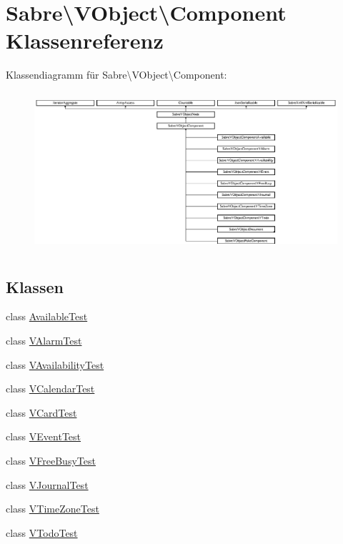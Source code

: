 \hypertarget{class_sabre_1_1_v_object_1_1_component}{}\section{Sabre\textbackslash{}V\+Object\textbackslash{}Component Klassenreferenz}
\label{class_sabre_1_1_v_object_1_1_component}
Klassendiagramm für Sabre\textbackslash{}V\+Object\textbackslash{}Component\+:\begin{figure}[H]
\begin{center}
\leavevmode
\includegraphics[height=5.918699cm]{class_sabre_1_1_v_object_1_1_component}
\end{center}
\end{figure}
\subsection*{Klassen}
\begin{DoxyCompactItemize}
\item 
class \mbox{\hyperlink{class_sabre_1_1_v_object_1_1_component_1_1_available_test}{Available\+Test}}
\item 
class \mbox{\hyperlink{class_sabre_1_1_v_object_1_1_component_1_1_v_alarm_test}{V\+Alarm\+Test}}
\item 
class \mbox{\hyperlink{class_sabre_1_1_v_object_1_1_component_1_1_v_availability_test}{V\+Availability\+Test}}
\item 
class \mbox{\hyperlink{class_sabre_1_1_v_object_1_1_component_1_1_v_calendar_test}{V\+Calendar\+Test}}
\item 
class \mbox{\hyperlink{class_sabre_1_1_v_object_1_1_component_1_1_v_card_test}{V\+Card\+Test}}
\item 
class \mbox{\hyperlink{class_sabre_1_1_v_object_1_1_component_1_1_v_event_test}{V\+Event\+Test}}
\item 
class \mbox{\hyperlink{class_sabre_1_1_v_object_1_1_component_1_1_v_free_busy_test}{V\+Free\+Busy\+Test}}
\item 
class \mbox{\hyperlink{class_sabre_1_1_v_object_1_1_component_1_1_v_journal_test}{V\+Journal\+Test}}
\item 
class \mbox{\hyperlink{class_sabre_1_1_v_object_1_1_component_1_1_v_time_zone_test}{V\+Time\+Zone\+Test}}
\item 
class \mbox{\hyperlink{class_sabre_1_1_v_object_1_1_component_1_1_v_todo_test}{V\+Todo\+Test}}
\end{DoxyCompactItemize}
